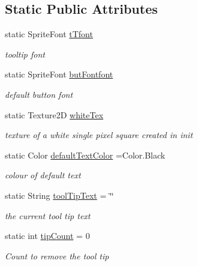 \subsection*{Static Public Attributes}
\begin{DoxyCompactItemize}
\item 
static Sprite\+Font \mbox{\hyperlink{class_r_c___framework_1_1_g_u_i___globals_a0cb017063b9f1371c23ca904c0acfe4f}{t\+Tfont}}
\begin{DoxyCompactList}\small\item\em tooltip font \end{DoxyCompactList}\item 
static Sprite\+Font \mbox{\hyperlink{class_r_c___framework_1_1_g_u_i___globals_a526c8c29b59e49a36a694766d68be3a2}{but\+Fontfont}}
\begin{DoxyCompactList}\small\item\em default button font \end{DoxyCompactList}\item 
static Texture2D \mbox{\hyperlink{class_r_c___framework_1_1_g_u_i___globals_a15d0dc59ca1781f17cc4f9feff08a69d}{white\+Tex}}
\begin{DoxyCompactList}\small\item\em texture of a white single pixel square created in init \end{DoxyCompactList}\item 
static Color \mbox{\hyperlink{class_r_c___framework_1_1_g_u_i___globals_a149f6621702e4c688b77654976f43480}{default\+Text\+Color}} =Color.\+Black
\begin{DoxyCompactList}\small\item\em colour of default text \end{DoxyCompactList}\item 
static String \mbox{\hyperlink{class_r_c___framework_1_1_g_u_i___globals_ab8cd0d0d6d99f7d40fbb1e3c974003dc}{tool\+Tip\+Text}} = \char`\"{}\char`\"{}
\begin{DoxyCompactList}\small\item\em the current tool tip text \end{DoxyCompactList}\item 
static int \mbox{\hyperlink{class_r_c___framework_1_1_g_u_i___globals_a1f046b87c9f05d297f26881c2197368b}{tip\+Count}} = 0
\begin{DoxyCompactList}\small\item\em Count to remove the tool tip \end{DoxyCompactList}\item 

\end{DoxyCompactItemize}
